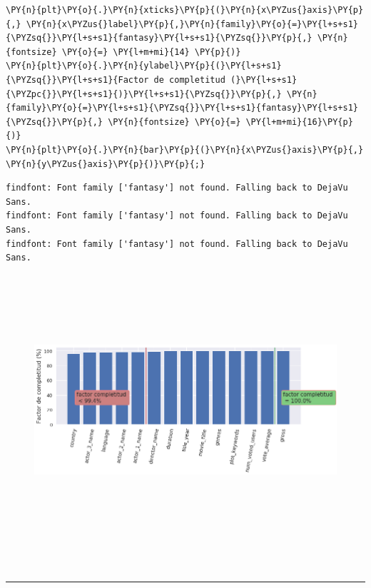 \begin{tcolorbox}[breakable, size=fbox, boxrule=1pt, pad at break*=1mm,colback=cellbackground, colframe=cellborder]
\begin{Verbatim}[commandchars=\\\{\}]
\PY{n}{plt}\PY{o}{.}\PY{n}{xticks}\PY{p}{(}\PY{n}{x\PYZus{}axis}\PY{p}{,} \PY{n}{x\PYZus{}label}\PY{p}{,}\PY{n}{family}\PY{o}{=}\PY{l+s+s1}{\PYZsq{}}\PY{l+s+s1}{fantasy}\PY{l+s+s1}{\PYZsq{}}\PY{p}{,} \PY{n}{fontsize} \PY{o}{=} \PY{l+m+mi}{14} \PY{p}{)}
\PY{n}{plt}\PY{o}{.}\PY{n}{ylabel}\PY{p}{(}\PY{l+s+s1}{\PYZsq{}}\PY{l+s+s1}{Factor de completitud (}\PY{l+s+s1}{\PYZpc{}}\PY{l+s+s1}{)}\PY{l+s+s1}{\PYZsq{}}\PY{p}{,} \PY{n}{family}\PY{o}{=}\PY{l+s+s1}{\PYZsq{}}\PY{l+s+s1}{fantasy}\PY{l+s+s1}{\PYZsq{}}\PY{p}{,} \PY{n}{fontsize} \PY{o}{=} \PY{l+m+mi}{16}\PY{p}{)}
\PY{n}{plt}\PY{o}{.}\PY{n}{bar}\PY{p}{(}\PY{n}{x\PYZus{}axis}\PY{p}{,} \PY{n}{y\PYZus{}axis}\PY{p}{)}\PY{p}{;}
\end{Verbatim}
\end{tcolorbox}

    \begin{Verbatim}[commandchars=\\\{\}]
findfont: Font family ['fantasy'] not found. Falling back to DejaVu Sans.
findfont: Font family ['fantasy'] not found. Falling back to DejaVu Sans.
findfont: Font family ['fantasy'] not found. Falling back to DejaVu Sans.
\end{Verbatim}

\begin{figure}[h]
    \centering
    \captionsetup{width=10cm}
    \includegraphics[height=10cm]{./contenido/imagenes/output_74_1.png}
\end{figure}
    { \hspace*{\fill} \\}
    
    \begin{center}\rule{0.5\linewidth}{\linethickness}\end{center}

